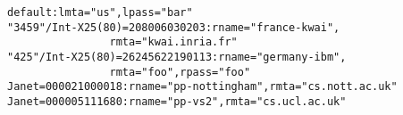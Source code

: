 {\small
\begin{verbatim}
default:lmta="us",lpass="bar"
"3459"/Int-X25(80)=208006030203:rname="france-kwai",
                rmta="kwai.inria.fr"
"425"/Int-X25(80)=26245622190113:rname="germany-ibm",
                rmta="foo",rpass="foo"
Janet=000021000018:rname="pp-nottingham",rmta="cs.nott.ac.uk"
Janet=000005111680:rname="pp-vs2",rmta="cs.ucl.ac.uk"
\end{verbatim}
}

